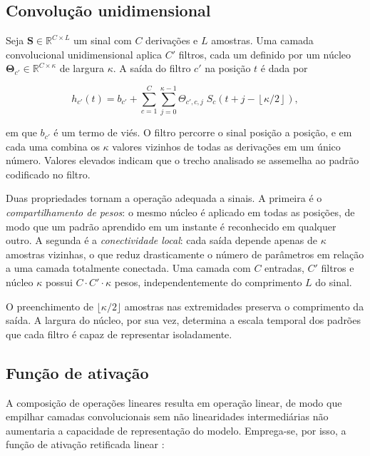 \subsection{Convolução unidimensional}
\label{subsec:fund-convolucao}

Seja $\mathbf{S} \in \mathbb{R}^{C \times L}$ um sinal com $C$ derivações e
$L$ amostras. Uma camada convolucional unidimensional aplica $C'$ filtros,
cada um definido por um núcleo $\boldsymbol{\Theta}_{c'} \in
	\mathbb{R}^{C \times \kappa}$ de largura $\kappa$. A saída do filtro $c'$ na
posição $t$ é dada por

\begin{equation}
	h_{c'}(t) = b_{c'} + \sum_{c=1}^{C} \sum_{j=0}^{\kappa-1}
	\Theta_{c',c,j} \; S_{c}\!\left(t + j - \left\lfloor \kappa/2 \right\rfloor\right),
	\label{eq:convolucao}
\end{equation}

\noindent
em que $b_{c'}$ é um termo de viés. O filtro percorre o sinal posição a
posição, e em cada uma combina os $\kappa$ valores vizinhos de todas as
derivações em um único número. Valores elevados indicam que o trecho
analisado se assemelha ao padrão codificado no filtro.

Duas propriedades tornam a operação adequada a sinais. A primeira é o
\textit{compartilhamento de pesos}: o mesmo núcleo é aplicado em todas as
posições, de modo que um padrão aprendido em um instante é reconhecido em
qualquer outro. A segunda é a \textit{conectividade local}: cada saída
depende apenas de $\kappa$ amostras vizinhas, o que reduz drasticamente o
número de parâmetros em relação a uma camada totalmente conectada. Uma
camada com $C$ entradas, $C'$ filtros e núcleo $\kappa$ possui
$C \cdot C' \cdot \kappa$ pesos, independentemente do comprimento $L$ do
sinal.

O preenchimento de $\lfloor \kappa/2 \rfloor$ amostras nas extremidades
preserva o comprimento da saída. A largura do núcleo, por sua vez, determina
a escala temporal dos padrões que cada filtro é capaz de representar
isoladamente.

\subsection{Função de ativação}
\label{subsec:fund-ativacao}

A composição de operações lineares resulta em operação linear, de modo que
empilhar camadas convolucionais sem não linearidades intermediárias não
aumentaria a capacidade de representação do modelo. Emprega-se, por isso, a
função de ativação retificada linear \cite{nair2010rectified}:

